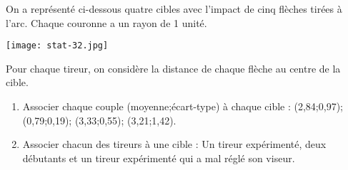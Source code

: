 
On a représenté ci-dessous quatre cibles avec l'impact de cinq flèches tirées à l'arc. Chaque couronne a un rayon de 1 unité.

\begin{center}
\texttt{[image: stat-32.jpg]}
\end{center}

Pour chaque tireur, on considère la distance de chaque flèche au centre de la cible.
\begin{enumerate}
\item Associer chaque couple (moyenne;écart-type) à chaque cible : (2,84;0,97); (0,79;0,19); (3,33;0,55); (3,21;1,42).
\item Associer chacun des tireurs à une cible : Un tireur expérimenté, deux débutants et un tireur expérimenté qui a mal réglé son viseur.
\end{enumerate} 